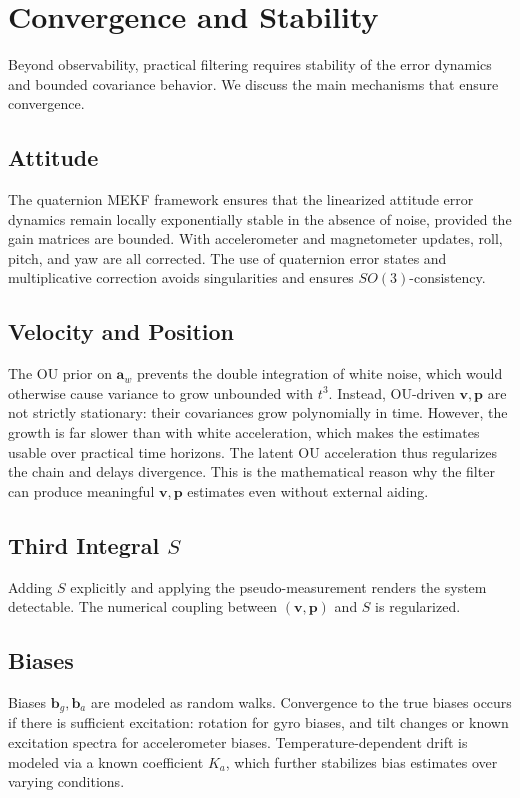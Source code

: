 \documentclass[10pt]{extarticle}
\begin{document}
\section{Convergence and Stability}
\label{sec:convergence}

Beyond observability, practical filtering requires stability of the error dynamics and
bounded covariance behavior. We discuss the main mechanisms that ensure convergence.

\subsection{Attitude}
The quaternion MEKF framework ensures that the linearized attitude error dynamics remain
locally exponentially stable in the absence of noise, provided the gain matrices are bounded.
With accelerometer and magnetometer updates, roll, pitch, and yaw are all corrected. The use
of quaternion error states and multiplicative correction avoids singularities and ensures
$SO(3)$-consistency.

\subsection{Velocity and Position}
The OU prior on $\bm a_w$ prevents the double integration of white noise, which would otherwise
cause variance to grow unbounded with $t^3$. Instead, OU-driven $\bm v,\bm p$ are not strictly stationary: their covariances grow polynomially in time. However, the growth is far slower than with white acceleration, which makes the estimates usable over practical time horizons. The latent OU acceleration thus regularizes the chain and delays divergence. This is the mathematical reason
why the filter can produce meaningful $\bm v,\bm p$ estimates even without external aiding.

\subsection{Third Integral $S$}
Adding $S$ explicitly and applying the pseudo-measurement renders the system detectable. The
numerical coupling between $(\bm v,\bm p)$ and $S$ is regularized.

\subsection{Biases}
Biases $\bm b_g,\bm b_a$ are modeled as random walks. Convergence to
the true biases occurs if there is sufficient excitation: rotation for gyro biases, and tilt
changes or known excitation spectra for accelerometer biases. Temperature-dependent drift is
modeled via a known coefficient $K_a$, which further stabilizes bias estimates over varying
conditions.
\end{document}
